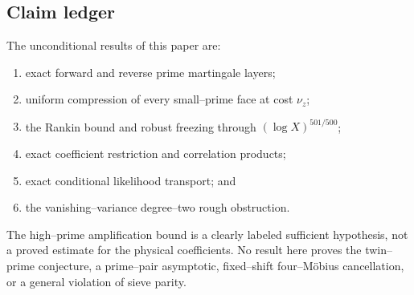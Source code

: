 \subsection{Claim ledger}

The unconditional results of this paper are:
\begin{enumerate}[label=(\roman*)]
 \item exact forward and reverse prime martingale layers;
 \item uniform compression of every small--prime face at cost \(\nu_z\);
 \item the Rankin bound and robust freezing through
 \((\log X)^{501/500}\);
 \item exact coefficient restriction and correlation products;
 \item exact conditional likelihood transport; and
 \item the vanishing--variance degree--two rough obstruction.
\end{enumerate}
The high--prime amplification bound is a clearly labeled sufficient
hypothesis, not a proved estimate for the physical coefficients.  No
result here proves the twin--prime conjecture, a prime--pair asymptotic,
fixed--shift four--M\"obius cancellation, or a general violation of sieve
parity.
